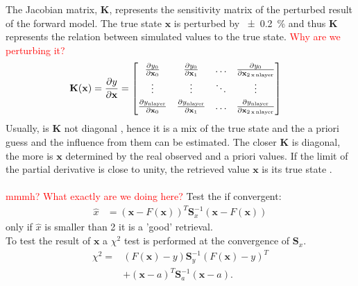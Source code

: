 The Jacobian matrix, $\mathbf{K}$, represents the sensitivity matrix of the perturbed result of the forward model. The true state $\mathbf{x}$ is perturbed by \SI{\pm 0.2}{\percent} and thus $\mathbf{K}$ represents the relation between simulated values to the true state.  \textcolor{red}{Why are we perturbing it?}
\begin{align}
\mathbf{K}(\mathbf{x}) & = \frac{\partial y}{\partial \mathbf{x}} =
\begin{bmatrix}
\frac{\partial y_0}{\partial \mathbf{x}_0} & 
\frac{\partial y_0}{\partial \mathbf{x}_1}  & 
\ldots & 
\frac{\partial y_0}{\partial \mathbf{x}_{2\,\text{x\,nlayer}}} \\[0.3em]
\vdots & \vdots & \ddots & \vdots \\[0.3em]
\frac{\partial y_{\text{nlayer}}}{\partial \mathbf{x}_0} &
\frac{\partial y_{\text{nlayer}}}{\partial \mathbf{x}_1} &
\ldots &
\frac{\partial y_{\text{nlayer}}}{\partial \mathbf{x}_{2\,\text{x\,nlayer}}}
\end{bmatrix} %
\label{eq:Kmatrix}
\end{align}
Usually, is $\mathbf{K}$ not diagonal \citep{wood_estimation_2011}, hence it is a mix of the true state and the a priori guess and the influence from them can be estimated. 
The closer $\mathbf{K}$ is diagonal, the more is $\mathbf{x}$ determined by the real observed and a priori values. If the limit of the partial derivative is close to unity, the retrieved value $\mathbf{x}$ is its true state \citep{wood_estimation_2011}. \\
\\
\textcolor{red}{mmmh? What exactly are we doing here?}
Test the if convergent:
\begin{align}
\hat{x} & = \left( \mathbf{x} - F(\mathbf{x}) \right)^T \mathbf{S}_x^{-1} \left(\mathbf{x} - F(\mathbf{x}) \right)
\end{align}
only if $\hat{x}$ is smaller than \num{2} it is a 'good' retrieval. 
\\
To test the result of $\mathbf{x}$ a $\chi^2$ test is performed at the convergence of $\mathbf{S}_x$.
%
\begin{equation}
\begin{split}
\chi^2 = & \left( F(\mathbf{x}) - y  \right) \mathbf{S}_y^{-1} \left( F(\mathbf{x}) - y \right)^T \\
& + \left( \mathbf{x} - a \right)^T \mathbf{S}_a^{-1} \left( \mathbf{x} - a\right). 
\end{split}
\label{eq:chi}
\end{equation}
